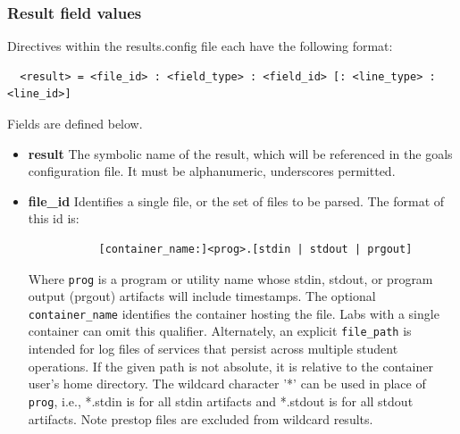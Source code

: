 \documentclass[12pt]{article}
\begin{document}
\subsubsection{Result field values}
Directives within the results.config file each have the following format:

\begin{verbatim}
  <result> = <file_id> : <field_type> : <field_id> [: <line_type> : <line_id>]
\end{verbatim}
\noindent Fields are defined below.
\begin{itemize}
\item \textbf{result} The symbolic name of the result, which will be referenced in the goals 
configuration file.  It must be alphanumeric, underscores permitted.
\item \textbf{file\_id} Identifies a single file, or the set of files to be parsed.  The format of this id is:
\begin{verbatim}
           [container_name:]<prog>.[stdin | stdout | prgout] 
\end{verbatim}
Where {\tt prog} is a program or utility name whose stdin, stdout,
or program output (prgout) artifacts will include timestamps.  
The optional {\tt container\_name} identifies the container hosting 
the file.  Labs with a single container can omit this qualifier.  
Alternately, an explicit {\tt file\_path} is intended for log files of services that persist 
across multiple student operations.  If the given path is not 
absolute, it is relative to the container user's home directory. 
The wildcard character '*' can be used in place of {\tt prog},
i.e., *.stdin is for all stdin artifacts and *.stdout is for all 
stdout artifacts. Note prestop files are excluded from wildcard
results. 
                  

\end{itemize}
\end{document}
